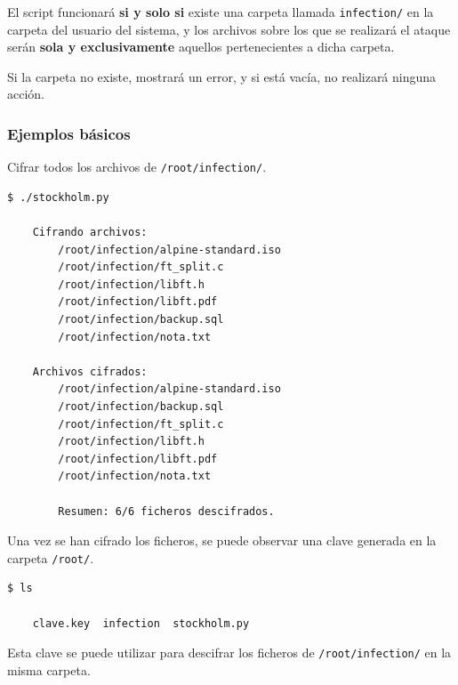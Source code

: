             El script funcionará \textbf{si y solo si} existe una carpeta llamada \texttt{infection/} en la carpeta del usuario del sistema, y los archivos sobre los que se realizará el ataque serán \textbf{sola y exclusivamente} aquellos pertenecientes a dicha carpeta.

            Si la carpeta no existe, mostrará un error, y si está vacía, no realizará ninguna acción.

            \newpage

            \subsubsection{Ejemplos básicos}

                Cifrar todos los archivos de \texttt{/root/infection/}.
                \\

                \begin{lstlisting}[style=bash_style, basicstyle=\ttfamily\scriptsize, caption={Fragmento de la salida del proyecto \texttt{stockholm}.}]
    $ ./stockholm.py

    Cifrando archivos:
        /root/infection/alpine-standard.iso
        /root/infection/ft_split.c
        /root/infection/libft.h
        /root/infection/libft.pdf
        /root/infection/backup.sql
        /root/infection/nota.txt

    Archivos cifrados:
        /root/infection/alpine-standard.iso
        /root/infection/backup.sql
        /root/infection/ft_split.c
        /root/infection/libft.h
        /root/infection/libft.pdf
        /root/infection/nota.txt

        Resumen: 6/6 ficheros descifrados.
                \end{lstlisting}
                
                Una vez se han cifrado los ficheros, se puede observar una clave generada en la carpeta \texttt{/root/}.

                \begin{lstlisting}[style=bash_style]
    $ ls

    clave.key  infection  stockholm.py
                \end{lstlisting}

                Esta clave se puede utilizar para descifrar los ficheros de \texttt{/root/infection/} en la misma carpeta.
                \\

